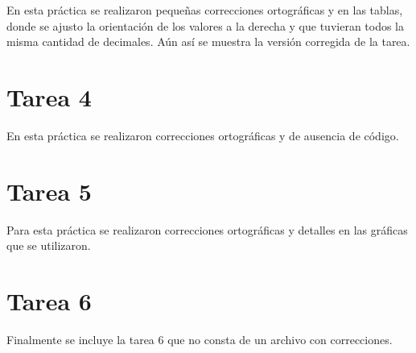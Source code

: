 \documentclass[11pt,a4paper]{article}
\begin{document}
En esta práctica se realizaron pequeñas correcciones ortográficas y en las tablas, donde se ajusto la orientación de los valores a la derecha y que tuvieran todos la misma cantidad de decimales. Aún así se muestra la versión corregida de la tarea. 

\newpage

\newpage


\section*{Tarea 4}

En esta práctica se realizaron correcciones ortográficas y de ausencia de código. 

\newpage

\newpage


\section*{Tarea 5}

Para esta práctica se realizaron correcciones ortográficas y detalles en las gráficas que se utilizaron. 

\newpage

\newpage


\section*{Tarea 6}

Finalmente se incluye la tarea 6 que no consta de un archivo con correcciones. 

\newpage

\end{document}

